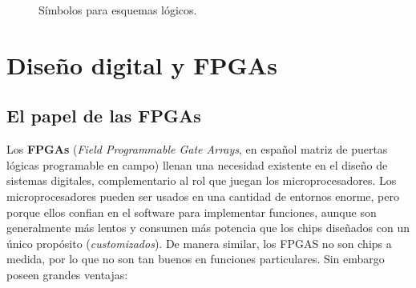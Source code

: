 \begin{figure}[H] \centering
{}
\caption{Símbolos para esquemas lógicos.}
\end{figure}

\section{Diseño digital y FPGAs}

\subsection{El papel de las FPGAs}

Los \textbf{FPGAs} (\textit{Field Programmable Gate Arrays}, en español matriz de puertas lógicas programable en campo) llenan una necesidad existente en el diseño de sistemas digitales, complementario al rol que juegan los microprocesadores. Los microprocesadores pueden ser usados en una cantidad de entornos enorme, pero porque ellos confian en el software para implementar funciones, aunque son generalmente más lentos y consumen más potencia que los chips diseñados con un único propósito (\textit{customizados}). De manera similar, los FPGAS no son chips a medida, por lo que no son tan buenos en funciones particulares. Sin embargo poseen grandes ventajas: 

